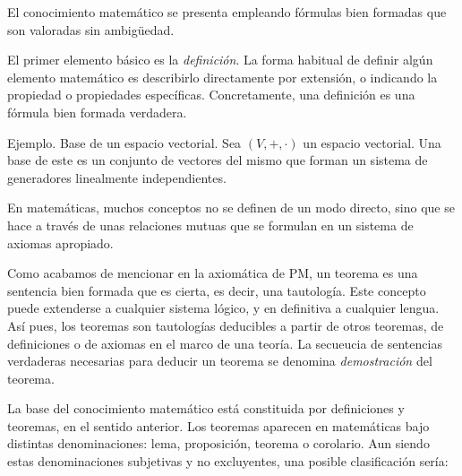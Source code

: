 




El conocimiento matemático se presenta empleando fórmulas bien formadas que
son valoradas sin ambigüedad.


El primer elemento básico es la \emph{definición}. La forma habitual de
definir algún elemento matemático es describirlo directamente por extensión,
o indicando la propiedad o propiedades específicas. Concretamente, una
definición es una fórmula bien formada verdadera.

Ejemplo. Base de un espacio vectorial. Sea $(V, +, \cdot)$ un espacio
vectorial. Una base de este es un conjunto de vectores del mismo que forman
un sistema de generadores linealmente independientes.

En matemáticas, muchos conceptos no se definen de un modo directo, sino que
se hace a través de unas relaciones mutuas que se formulan en un sistema de
axiomas apropiado.

Como acabamos de mencionar en la axiomática de PM, un teorema es una
sentencia bien formada que es cierta, es decir, una tautología. Este
concepto puede extenderse a cualquier sistema lógico, y en definitiva a
cualquier lengua. Así pues, los teoremas son tautologías deducibles a partir
de otros teoremas, de definiciones o de axiomas en el marco de una teoría.
La secueucia de sentencias verdaderas necesarias para deducir un teorema se
denomina \emph{demostración} del teorema.

La base del conocimiento matemático está constituida por definiciones y
teoremas, en el sentido anterior. Los teoremas aparecen en matemáticas bajo
distintas denominaciones: lema, proposición, teorema o corolario. Aun siendo
estas denominaciones subjetivas y no excluyentes, una posible clasificación
sería:

